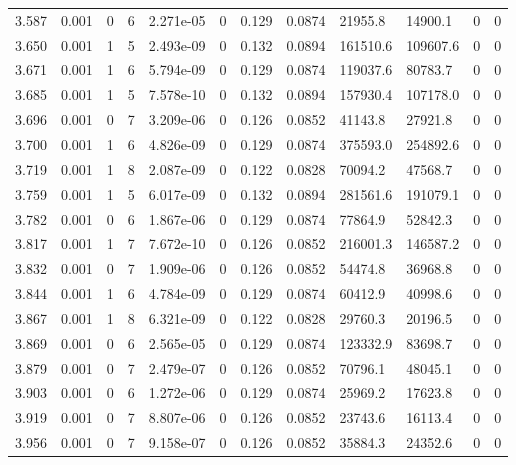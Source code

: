 \documentclass[preview]{standalone}
\begin{document}
{{{{\begin{tabular}{L{1.2cm}C{1.2cm} C{0.3cm}C{0.5cm} C{1.4cm}C{1.4cm} C{1.4cm}C{1.4cm} C{1.6cm}C{1.6cm} C{1.6cm}C{1.6cm}}
  3.587  &  0.001  & 0     &  6 &  2.271e-05  & 0  &  0.129&   0.0874& 21955.8 & 14900.1   &  0 & 0  \\ 
  3.650  &  0.001  & 1     &  5 &  2.493e-09  & 0  &  0.132&   0.0894& 161510.6 & 109607.6   &  0 & 0  \\ 
  3.671  &  0.001  & 1     &  6 &  5.794e-09  & 0  &  0.129&   0.0874& 119037.6 & 80783.7   &  0 & 0  \\ 
  3.685  &  0.001  & 1     &  5 &  7.578e-10  & 0  &  0.132&   0.0894& 157930.4 & 107178.0   &  0 & 0  \\ 
  3.696  &  0.001  & 0     &  7 &  3.209e-06  & 0  &  0.126&   0.0852& 41143.8 & 27921.8   &  0 & 0  \\ 
  3.700  &  0.001  & 1     &  6 &  4.826e-09  & 0  &  0.129&   0.0874& 375593.0 & 254892.6   &  0 & 0  \\ 
  3.719  &  0.001  & 1     &  8 &  2.087e-09  & 0  &  0.122&   0.0828& 70094.2 & 47568.7   &  0 & 0  \\ 
  3.759  &  0.001  & 1     &  5 &  6.017e-09  & 0  &  0.132&   0.0894& 281561.6 & 191079.1   &  0 & 0  \\ 
  3.782  &  0.001  & 0     &  6 &  1.867e-06  & 0  &  0.129&   0.0874& 77864.9 & 52842.3   &  0 & 0  \\ 
  3.817  &  0.001  & 1     &  7 &  7.672e-10  & 0  &  0.126&   0.0852& 216001.3 & 146587.2   &  0 & 0  \\ 
  3.832  &  0.001  & 0     &  7 &  1.909e-06  & 0  &  0.126&   0.0852& 54474.8 & 36968.8   &  0 & 0  \\ 
  3.844  &  0.001  & 1     &  6 &  4.784e-09  & 0  &  0.129&   0.0874& 60412.9 & 40998.6   &  0 & 0  \\ 
  3.867  &  0.001  & 1     &  8 &  6.321e-09  & 0  &  0.122&   0.0828& 29760.3 & 20196.5   &  0 & 0  \\ 
  3.869  &  0.001  & 0     &  6 &  2.565e-05  & 0  &  0.129&   0.0874& 123332.9 & 83698.7   &  0 & 0  \\ 
  3.879  &  0.001  & 0     &  7 &  2.479e-07  & 0  &  0.126&   0.0852& 70796.1 & 48045.1   &  0 & 0  \\ 
  3.903  &  0.001  & 0     &  6 &  1.272e-06  & 0  &  0.129&   0.0874& 25969.2 & 17623.8   &  0 & 0  \\ 
  3.919  &  0.001  & 0     &  7 &  8.807e-06  & 0  &  0.126&   0.0852& 23743.6 & 16113.4   &  0 & 0  \\ 
  3.956  &  0.001  & 0     &  7 &  9.158e-07  & 0  &  0.126&   0.0852& 35884.3 & 24352.6   &  0 & 0  \\ 

\end{tabular}}}}}
\end{document}
